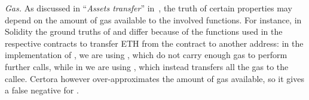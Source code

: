 
\emph{Gas.} %
As discussed in ``\emph{Assets transfer}'' in~,
the truth of certain properties may depend on the amount of gas available to the involved functions. 
For instance, in Solidity the ground truths of
 and
 differ because 
of the functions used in the respective contracts to transfer ETH
from the contract to another address:
in the implementation of , we are using , 
which do not carry enough gas to perform further calls,
while in  we are using , which
instead transfers all the gas to the callee.
Certora however over-approximates the amount of gas available, so it gives a false negative for .

